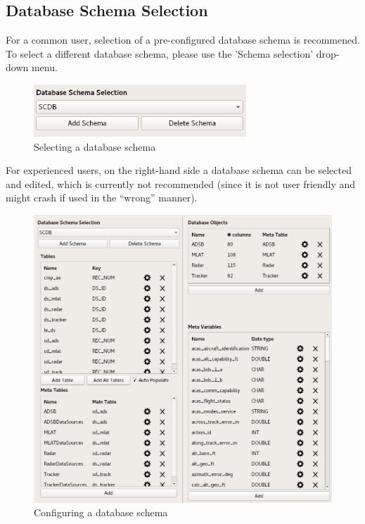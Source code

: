 \documentclass[10pt,letterpaper,extrafontsizes]{memoir}
\begin{document}
\subsection{Database Schema Selection}
For a common user, selection of a pre-configured database schema is recommened. To select a different database schema, please use the 'Schema selection' drop-down menu.\\

\begin{figure}[H]
  \center
    \includegraphics[width=8cm]{../screenshots/database_schema_selection.png}
  \caption{Selecting a database schema}
  \label{fig:db_schema_select}
\end{figure}

For experienced users, on the right-hand side a database schema can be selected and edited, which is currently not recommended (since it is not user friendly and might crash if used in the ``wrong'' manner).

\begin{figure}[H]
  \hspace*{-1cm}
    \includegraphics[width=16cm]{../screenshots/database_schema_configuration.png}
  \caption{Configuring a database schema}
  \label{fig:db_schema_configuration}
\end{figure}
\end{document}
